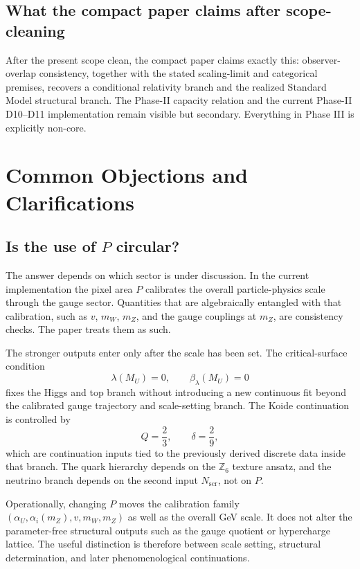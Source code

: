 \documentclass[11pt]{article}
\begin{document}
\subsection{What the compact paper claims after scope-cleaning}

After the present scope clean, the compact paper claims exactly this: observer-overlap consistency, together with the stated scaling-limit and categorical premises, recovers a conditional relativity branch and the realized Standard Model structural branch. The Phase-II capacity relation and the current Phase-II D10--D11 implementation remain visible but secondary. Everything in Phase III is explicitly non-core.

\section{Common Objections and Clarifications}

\subsection{\texorpdfstring{Is the use of $P$ circular?}{Is the use of P circular?}}

The answer depends on which sector is under discussion. In the current implementation the pixel area $P$ calibrates the overall particle-physics scale through the gauge sector. Quantities that are algebraically entangled with that calibration, such as $v$, $m_W$, $m_Z$, and the gauge couplings at $m_Z$, are consistency checks. The paper treats them as such.

The stronger outputs enter only after the scale has been set. The critical-surface condition
\[
\lambda(M_U)=0,\qquad \beta_\lambda(M_U)=0
\]
fixes the Higgs and top branch without introducing a new continuous fit beyond the calibrated gauge trajectory and scale-setting branch. The Koide continuation is controlled by
\[
Q=\frac23,\qquad \delta=\frac29,
\]
which are continuation inputs tied to the previously derived discrete data inside that branch. The quark hierarchy depends on the $\mathbb Z_6$ texture ansatz, and the neutrino branch depends on the second input $N_{\mathrm{scr}}$, not on $P$.

Operationally, changing $P$ moves the calibration family $(\alpha_U,\alpha_i(m_Z),v,m_W,m_Z)$ as well as the overall GeV scale. It does not alter the parameter-free structural outputs such as the gauge quotient or hypercharge lattice. The useful distinction is therefore between scale setting, structural determination, and later phenomenological continuations.
\end{document}
